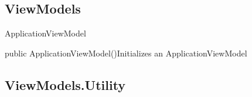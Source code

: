 \subsection*{ViewModels}

\begin{class}{ApplicationViewModel}


    \clsdsp{}

	\begin{attributes}
    \end{attributes}    
    
    \begin{constructors}
        \begin{constructor}{public ApplicationViewModel()}{Initializes an ApplicationViewModel}
        \end{constructor}
     \end{constructors}
 

\end{class}

\subsection*{ViewModels.Utility}

